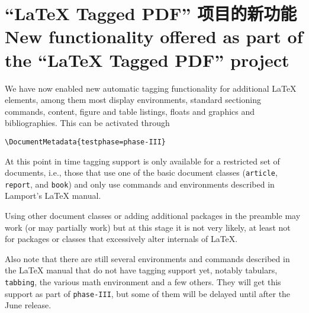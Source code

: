 \documentclass{ltnews}
\makeatletter
\renewcommand{\maketitle}{%
   \twocolumn[{%
      \parbox[t][7\baselineskip]{\textwidth}{%
         \@titlefont\@title\\[\medskipamount]
         \normalfont\normalsize\issuename~\@issue, \@year~年~\@month~月
      }%
   }]%
   \thispagestyle{titlepage}
}
\providecommand\tubcommand[1]{}
\newcommand{\zhquote}[1]{“#1”}
\makeatother
\begin{document}
\tubcommand{\addtolength\textheight{4.1pc}}   %

\maketitle
{  \spaceskip=3.33pt 
\tableofcontents}

\setlength{}

\tubcommand{\fontsize{9.6}{12}\selectfont}


\medskip



\section{\zhquote{\LaTeX{} Tagged PDF} 项目的新功能
  New functionality offered as part of the \enquote{\LaTeX{} Tagged PDF} project}

We have now enabled new automatic tagging functionality for additional
\LaTeX{} elements, among them most display environments, standard
sectioning commands, content, figure and table listings, floats and graphics and
bibliographies. This can
be activated through
\begin{verbatim}
\DocumentMetadata{testphase=phase-III}
\end{verbatim}
At this point in time tagging support is only available for a
restricted set of documents, i.e., those that use one of the basic
document classes (\texttt{article}, \texttt{report}, and
\texttt{book}) and only use commands and environments described in
Lamport's \LaTeX{} manual.

Using other document classes or adding additional packages in the
preamble may work (or may partially work) but at this stage it is not
very likely, at least not for packages or classes that excessively
alter internals of \LaTeX{}.

Also note that there are still several environments and commands
described in the \LaTeX{} manual that do not have tagging support yet,
notably tabulars, \texttt{tabbing}, the various math environment and a
few others.  They will get this support as part of \texttt{phase-III},
but some of them will be delayed until after the June release.
\end{document}

